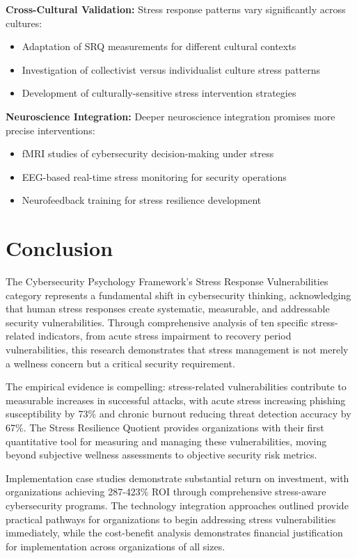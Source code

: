 \documentclass[11pt,a4paper]{article}
\begin{document}
\textbf{Cross-Cultural Validation:}
Stress response patterns vary significantly across cultures:
\begin{itemize}
\item Adaptation of SRQ measurements for different cultural contexts
\item Investigation of collectivist versus individualist culture stress patterns
\item Development of culturally-sensitive stress intervention strategies
\end{itemize}

\textbf{Neuroscience Integration:}
Deeper neuroscience integration promises more precise interventions:
\begin{itemize}
\item fMRI studies of cybersecurity decision-making under stress
\item EEG-based real-time stress monitoring for security operations
\item Neurofeedback training for stress resilience development
\end{itemize}

\section{Conclusion}

The Cybersecurity Psychology Framework's Stress Response Vulnerabilities category represents a fundamental shift in cybersecurity thinking, acknowledging that human stress responses create systematic, measurable, and addressable security vulnerabilities. Through comprehensive analysis of ten specific stress-related indicators, from acute stress impairment to recovery period vulnerabilities, this research demonstrates that stress management is not merely a wellness concern but a critical security requirement.

The empirical evidence is compelling: stress-related vulnerabilities contribute to measurable increases in successful attacks, with acute stress increasing phishing susceptibility by 73\% and chronic burnout reducing threat detection accuracy by 67\%. The Stress Resilience Quotient provides organizations with their first quantitative tool for measuring and managing these vulnerabilities, moving beyond subjective wellness assessments to objective security risk metrics.

Implementation case studies demonstrate substantial return on investment, with organizations achieving 287-423\% ROI through comprehensive stress-aware cybersecurity programs. The technology integration approaches outlined provide practical pathways for organizations to begin addressing stress vulnerabilities immediately, while the cost-benefit analysis demonstrates financial justification for implementation across organizations of all sizes.
\end{document}
